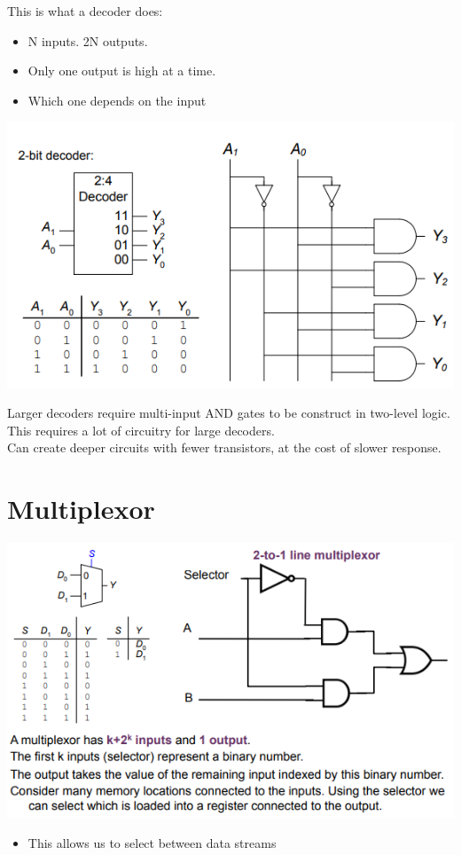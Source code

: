 \documentclass{article}[18pt]
\begin{document}
This is what a decoder does:
\begin{itemize}

\item N inputs. 2N outputs.
\item Only one output is high at a time.
\item Which one depends on the input

\end{itemize}
\begin{center}
	\includegraphics[scale=0.7]{decoder}
\end{center}
Larger decoders require multi-input AND gates to
be construct in two-level logic.\\
This requires a lot of circuitry for large decoders.\\
Can create deeper circuits with fewer transistors,
at the cost of slower response.
\section{Multiplexor}
\begin{center}
	\includegraphics[scale=0.7]{multiplexor}
\end{center}
\begin{itemize}
	\item This allows us to select between data streams
\end{itemize}
\end{document}
